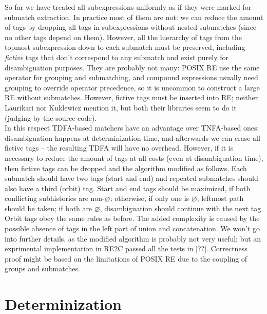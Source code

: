 \documentclass{article}
\theoremstyle{definition}
\begin{document}
\begin{multicols}{2}
So far we have treated all subexpressions uniformly as if they were marked for submatch extraction.
In practice most of them are not: we can reduce the amount of tags by dropping all tags in subexpressions without nested submatches
(since no other tags depend on them).
However, all the hierarchy of tags from the topmost subexpression down to each submatch must be preserved,
including \emph{fictive} tags that don't correspond to any submatch and exist purely for disambiguation purposes.
They are probably not many: POSIX RE use the same operator for grouping and submatching,
and compound expressions usually need grouping to override operator precedence,
so it is uncommon to construct a large RE without submatches.
However, fictive tags must be inserted into RE; neither Laurikari nor Kuklewicz mention it,
but both their libraries seem to do it (judging by the source code).
\\

In this respect TDFA-based matchers have an advantage over TNFA-based ones:
disambiguation happens at determinization time,
and afterwards we can erase all fictive tags -- the resulting TDFA will have no overhead.
However, if it is necessary to reduce the amount of tags at all costs (even at disambiguation time),
then fictive tags can be dropped and the algorithm modified as follows.
Each submatch should have two tags (start and end)
and repeated submatches should also have a third (orbit) tag.
Start and end tags should be maximized, if both conflicting subhistories are non-$\varnothing$;
otherwise, if only one is $\varnothing$, leftmost path should be taken;
if both are $\varnothing$, disambiguation should continue with the next tag.
Orbit tags obey the same rules as before.
The added complexity is caused by the possible absence of tags in the left part of union and concatenation.
We won't go into further details, as the modified algorithm is probably not very useful;
but an exprimental implementation in RE2C passed all the tests in [??].
Correctness proof might be based on the limitations of POSIX RE due to the coupling of groups and submatches.

\section{Determinization}\label{section_determinization}


\end{multicols}
\end{document}
